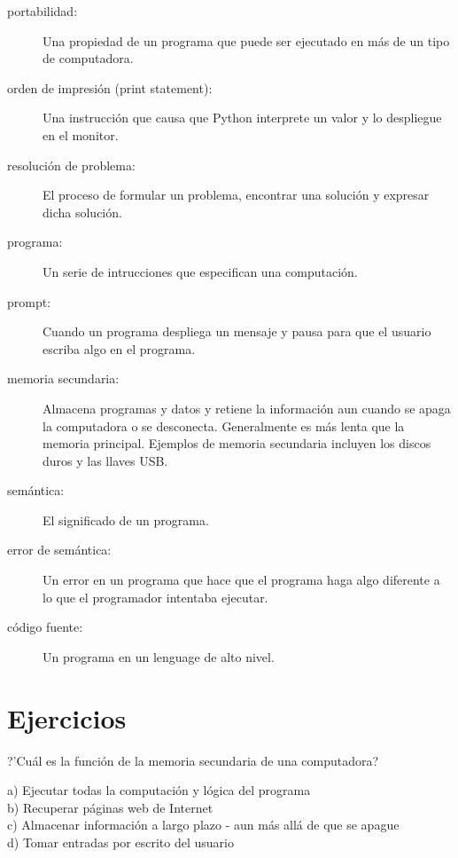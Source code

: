 \begin{description}
\item[portabilidad:]  Una propiedad de un programa que puede ser ejecutado en m\'as de un tipo de computadora.

\item[orden de impresi\'on (print statement):]  Una instrucci\'on que causa que Python
interprete un valor y lo despliegue en el monitor.

\item[resoluci\'on de problema:]  El proceso de formular un problema, encontrar una soluci\'on y expresar dicha soluci\'on.

\item[programa:] Un serie de intrucciones que especifican una computaci\'on.

\item[prompt:] Cuando un programa despliega un mensaje y pausa para que el usuario escriba algo en el programa.

\item[memoria secundaria:] Almacena programas y datos y retiene la informaci\'on aun cuando se apaga la computadora o se desconecta. Generalmente es m\'as lenta que la memoria principal. Ejemplos de memoria secundaria incluyen los discos duros y las llaves USB.

\item[sem\'antica:]  El significado de un programa.

\item[error de sem\'antica:]   Un error en un programa que hace que el programa haga algo diferente a lo que el programador intentaba ejecutar.

\item[c\'odigo fuente:]  Un programa en un lenguage de alto nivel.

\end{description}

\section{Ejercicios}


\begin{ex}
?'Cu\'al es la funci\'on de la memoria secundaria de una computadora?

a) Ejecutar todas la computaci\'on y l\'ogica del programa\\
b) Recuperar p\'aginas web de Internet\\
c) Almacenar informaci\'on a largo plazo - aun m\'as all\'a de que se apague\\
d) Tomar entradas por escrito del usuario 
\end{ex}

